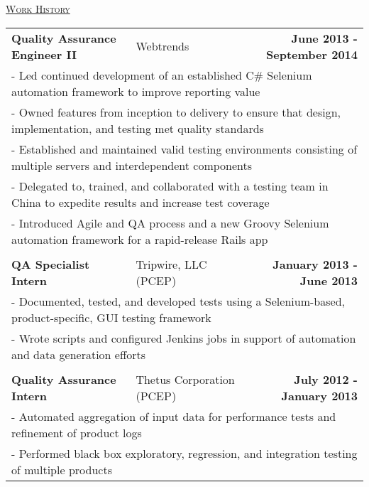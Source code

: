\documentclass[letterpaper]{article}
\begin{document}
	\begin{center}
		\underline{\large \scshape Work History} \\
		\begin{tabular}{p{}p{}r}
			\\
				\textbf{Quality Assurance Engineer II}					&
				Webtrends							&
				\textbf{June 2013 - September 2014}
			\\
				\multicolumn{3}{p{\textwidth}}{\quad\quad - Led continued development of an established C\# Selenium automation framework to improve reporting value}
			\\
				\multicolumn{3}{p{\textwidth}}{\quad\quad - Owned features from inception to delivery to ensure that design, implementation, and testing met quality standards} 
			\\
				\multicolumn{3}{p{\textwidth}}{\quad\quad - Established and maintained valid testing environments consisting of multiple servers and interdependent components} 
			\\
				\multicolumn{3}{p{\textwidth}}{\quad\quad - Delegated to, trained, and collaborated with a testing team in China to expedite results and increase test coverage}
			\\
				\multicolumn{3}{p{\textwidth}}{\quad\quad - Introduced Agile and QA process and a new Groovy Selenium automation framework for a rapid-release Rails app}  
			\\
			\\
				\textbf{QA Specialist Intern}					&
				Tripwire, LLC (PCEP)							&
				\textbf{January 2013 - June 2013}
			\\
				\multicolumn{3}{p{\textwidth}}{\quad\quad - Documented, tested, and developed tests using a Selenium-based, product-specific, GUI testing framework}
			\\
				\multicolumn{3}{p{\textwidth}}{\quad\quad - Wrote scripts and configured Jenkins jobs in support of automation and data generation efforts} 
			\\
			\\
				\textbf{Quality Assurance Intern}					&
				Thetus Corporation (PCEP)							&
				\textbf{July 2012 - January 2013}
			\\
				\multicolumn{3}{p{\textwidth}}{\quad\quad - Automated aggregation of input data for performance tests and refinement of product logs}
			\\
				\multicolumn{3}{p{\textwidth}}{\quad\quad - Performed black box exploratory, regression, and integration testing of multiple products} 

\end{tabular}
\end{center}
\end{document}
